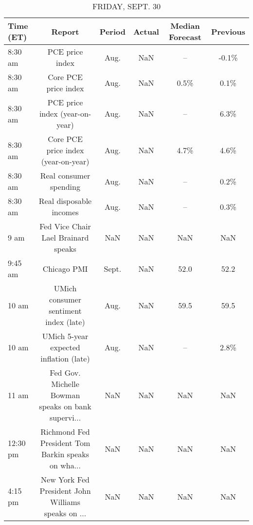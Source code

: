\documentclass{article}%
\begin{document}
%


\begin{table}[htbp]%
\caption{FRIDAY, SEPT. 30}%
\centering%
\begin{adjustbox}{width=1\textwidth}%
\begin{tabular}{lccccc}
\toprule
Time (ET) &                                             Report & Period & Actual & Median Forecast & Previous \\
\midrule
  8:30 am &                                    PCE price index &   Aug. &    NaN &              -- &    -0.1\% \\
  8:30 am &                               Core PCE price index &   Aug. &    NaN &            0.5\% &     0.1\% \\
  8:30 am &                     PCE price index (year-on-year) &   Aug. &    NaN &              -- &     6.3\% \\
  8:30 am &                Core PCE price index (year-on-year) &   Aug. &    NaN &            4.7\% &     4.6\% \\
  8:30 am &                             Real consumer spending &   Aug. &    NaN &              -- &     0.2\% \\
  8:30 am &                            Real disposable incomes &   Aug. &    NaN &              -- &     0.3\% \\
     9 am &                Fed Vice Chair Lael Brainard speaks &    NaN &    NaN &             NaN &      NaN \\
  9:45 am &                                        Chicago PMI &  Sept. &    NaN &            52.0 &     52.2 \\
    10 am &              UMich consumer sentiment index (late) &   Aug. &    NaN &            59.5 &     59.5 \\
    10 am &             UMich 5-year expected inflation (late) &   Aug. &    NaN &              -- &     2.8\% \\
    11 am & Fed Gov. Michelle Bowman speaks on bank supervi... &    NaN &    NaN &             NaN &      NaN \\
 12:30 pm & Richmond Fed President Tom Barkin speaks on wha... &    NaN &    NaN &             NaN &      NaN \\
  4:15 pm & New York Fed President John Williams speaks on ... &    NaN &    NaN &             NaN &      NaN \\
\bottomrule
\end{tabular}
%
\end{adjustbox}%
\end{table}
\end{document}
